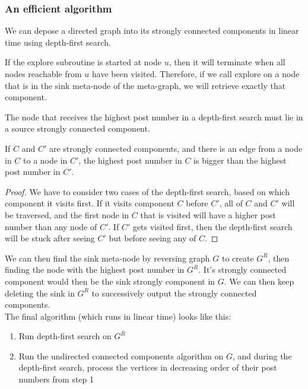 \subsubsection{An efficient algorithm}
We can depose a directed graph into its strongly connected components in linear time using depth-first search.
\begin{property}
  If the explore subroutine is started at node $u$, then it will terminate when all nodes reachable from $u$ have been visited.
  Therefore, if we call explore on a node that is in the sink meta-node of the meta-graph, we will retrieve exactly that component.
\end{property}
\begin{property}
  The node that receives the highest post number in a depth-first search must lie in a source strongly connected component.
\end{property}
\begin{property}
  If $C$ and $C'$ are strongly connected components, and there is an edge from a node in $C$ to a node in $C'$, the highest post number in $C$ is bigger than the highest post number in $C'$.
\end{property}
\begin{proof}
  We have to consider two cases of the depth-first search, based on which component it visits first.
  If it visits component $C$ before $C'$, all of $C$ and $C'$ will be traversed, and the first node in $C$ that is visited will have a higher post number than any node of $C'$.
  If $C'$ gets visited first, then the depth-first search will be stuck after seeing $C'$ but before seeing any of $C$.
\end{proof}

We can then find the sink meta-node by reversing graph $G$ to create $G^R$, then finding the node with the highest post number in $G^R$.
It's strongly connected component would then be the sink strongly component in $G$.
We can then keep deleting the sink in $G^R$ to successively output the strongly connected components.\\
The final algorithm (which runs in linear time) looks like this:
\begin{enumerate}
  \item{Run depth-first search on $G^R$}
  \item{Run the undirected connected components algorithm on $G$, and during the depth-first search, process the vertices in decreasing order of their post numbers from step 1}
\end{enumerate}

